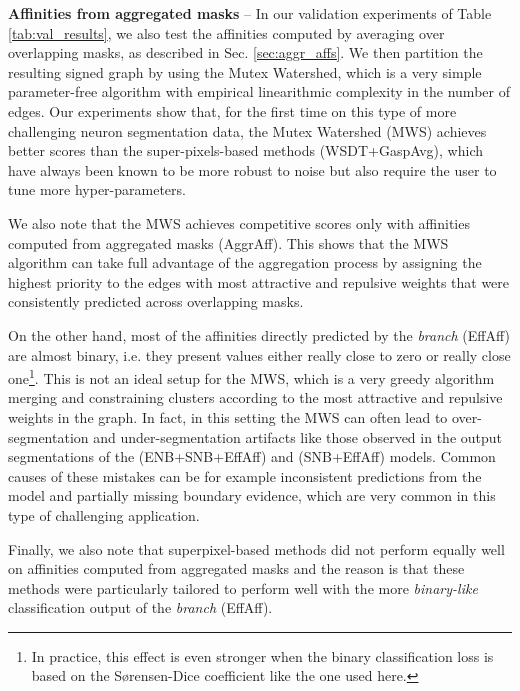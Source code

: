 \textbf{Affinities from aggregated masks}  -- 
In our validation experiments of Table \ref{tab:val_results}, we also test the affinities computed by averaging over overlapping masks, as described in Sec. \ref{sec:aggr_affs}. We then partition the resulting signed graph by using the Mutex Watershed, which is a very simple parameter-free algorithm with empirical linearithmic complexity in the number of edges. 
Our experiments show that, for the first time on this type of more challenging neuron segmentation data, the Mutex Watershed (MWS) achieves better scores than the super-pixels-based methods (WSDT+GaspAvg), which have always been known to be more robust to noise but also require the user to tune more hyper-parameters.   

We also note that the MWS achieves competitive scores only with affinities computed from aggregated masks (AggrAff).
This shows that the MWS algorithm can take full advantage of the \maskname aggregation process by assigning the highest priority to the edges with most attractive and repulsive weights that were consistently predicted across overlapping masks.

On the other hand, most of the affinities directly predicted by the \emph{\sparseBr branch} (EffAff) are almost binary, i.e. they present values either really close to zero or really close one\footnote{In practice, this effect is even stronger when the binary classification loss is based on the S\o rensen-Dice coefficient like the one used here.}.
This is not an ideal setup for the MWS, which is a very greedy algorithm merging and constraining clusters according to the most attractive and repulsive weights in the graph.
In fact, in this setting the MWS can often lead to over-segmentation and under-segmentation artifacts like those observed in the output segmentations of the (ENB+SNB+EffAff) and (SNB+EffAff) models. Common causes of these mistakes can be for example inconsistent predictions from the model and partially missing boundary evidence, which are very common in this type of challenging application. 

Finally, we also note that superpixel-based methods did not perform equally well on affinities computed from aggregated masks and the reason is that these methods were particularly tailored to perform well with the more \emph{binary-like} classification output of the \emph{\sparseBr branch} (EffAff). \\


